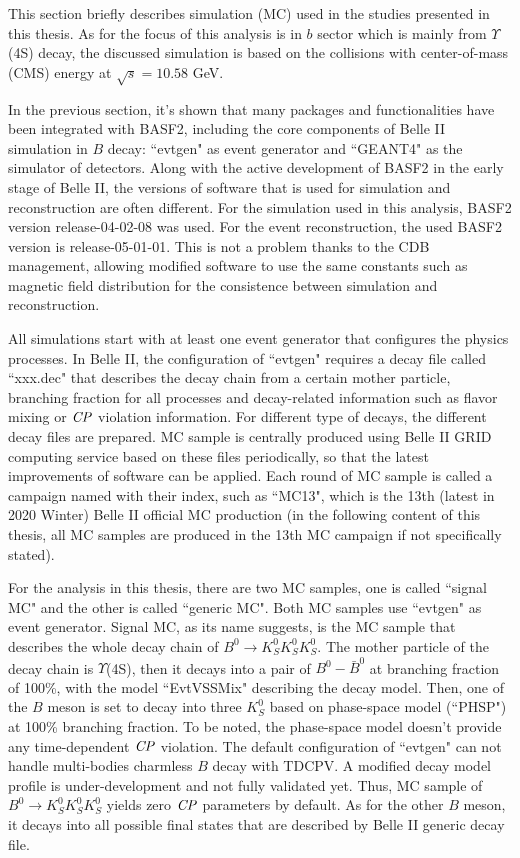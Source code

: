 This section briefly describes simulation (MC) used in the studies presented in this thesis. As for the focus of this analysis is in $b$ sector which is mainly from $\Upsilon$(4S) decay, the discussed simulation is based on the collisions with center-of-mass (CMS) energy at $\sqrt{s} = 10.58 $ GeV.

In the previous section, it's shown that many packages and functionalities have been integrated with BASF2, including the core components of Belle II simulation in $B$ decay: ``evtgen" as event generator\cite{evtgen} and ``GEANT4" as the simulator of detectors\cite{agostinelli2003geant4}. Along with the active development of BASF2 in the early stage of Belle II, the versions of software that is used for simulation and reconstruction are often different. For the simulation used in this analysis, BASF2 version release-04-02-08 was used. For the event reconstruction, the used BASF2 version is release-05-01-01. This is not a problem thanks to the CDB management, allowing modified software to use the same constants such as magnetic field distribution for the consistence between simulation and reconstruction.

 All simulations start with at least one event generator that configures the physics processes. In Belle II, the configuration of ``evtgen" requires a decay file called ``xxx.dec" that describes the decay chain from a certain mother particle, branching fraction for all processes and decay-related information such as flavor mixing or $\it{CP}$ violation information. For different type of decays, the different decay files are prepared. MC sample is centrally produced using Belle II GRID computing service based on these files periodically, so that the latest improvements of software can be applied. Each round of MC sample is called a campaign named with their index, such as ``MC13", which is the 13th (latest in 2020 Winter) Belle II official MC production (in the following content of this thesis, all MC samples are produced in the 13th MC campaign if not specifically stated). 
 
 For the analysis in this thesis, there are two MC samples, one is called ``signal MC" and the other is called ``generic MC". Both MC samples use ``evtgen" as event generator. Signal MC, as its name suggests, is the MC sample that describes the whole decay chain of $B^0 \to K_S^0  K_S^0  K_S^0$. The mother particle of the decay chain is $\Upsilon$(4S), then it decays into a pair of $B^0-\bar{B}^0$ at branching fraction of 100\%, with the model ``EvtVSSMix"\cite{evtgen} describing the decay model. Then, one of the $B$ meson is set to decay into three $K_S^0$ based on phase-space model (``PHSP") at 100\% branching fraction. To be noted, the phase-space model doesn't provide any time-dependent $\it{CP}$ violation. The default configuration of ``evtgen" can not handle multi-bodies charmless $B$ decay with TDCPV. A modified decay model profile is under-development and not fully validated yet. Thus, MC sample of $B^0 \to K_S^0  K_S^0  K_S^0$ yields zero $\it{CP}$ parameters by default. As for the other $B$ meson, it decays into all possible final states that are described by Belle II generic decay file. 
 
